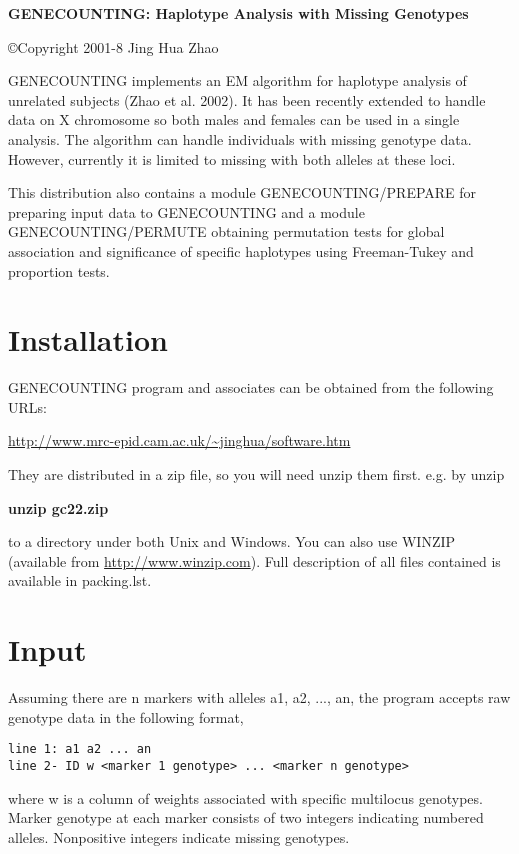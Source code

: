 \documentclass[11pt]{article}
\begin{document}
\pagestyle{myheadings}
\thispagestyle{empty}

{\noindent\bf GENECOUNTING: Haplotype Analysis with Missing
Genotypes}

\medskip\noindent \copyright Copyright 2001-8 Jing Hua Zhao

\bigskip\noindent GENECOUNTING implements an EM algorithm for
haplotype analysis of unrelated subjects (Zhao et al.  2002).  It
has been recently extended to handle data on X chromosome so both
males and females can be used in a single analysis. The algorithm
can handle individuals with missing genotype data.  However,
currently it is limited to missing with both alleles at these loci.

\medskip\noindent This distribution also contains a module
GENECOUNTING/PREPARE for preparing input data to GENECOUNTING and a
module GENECOUNTING/PERMUTE obtaining permutation tests for global
association and significance of specific haplotypes using
Freeman-Tukey and proportion tests.

\section{Installation}

\medskip\noindent GENECOUNTING program and associates can be obtained
from the following URLs:

\medskip
\url{http://www.mrc-epid.cam.ac.uk/~jinghua/software.htm}
\medskip

\medskip\noindent They are distributed in a zip file, so you will
need unzip them first. e.g. by unzip

\medskip
{\bf unzip gc22.zip}
\medskip

\medskip\noindent to a directory under both Unix and Windows.  You
can also use WINZIP (available from \url{http://www.winzip.com}).
Full description of all files contained is available in packing.lst.


\section{Input}

\medskip\noindent Assuming there are n markers with alleles a1, a2, ..., an,
the program accepts raw genotype data in the following format,

\begin{verbatim}
line 1: a1 a2 ... an
line 2- ID w <marker 1 genotype> ... <marker n genotype>
\end{verbatim}
\medskip\noindent where w is a column of weights associated with specific
multilocus genotypes. Marker genotype at each marker consists of two
integers indicating numbered alleles.  Nonpositive integers indicate
missing genotypes.
\end{document}
